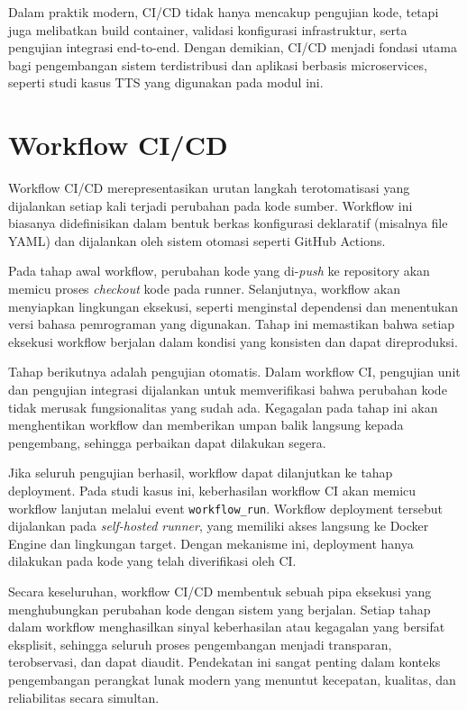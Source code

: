Dalam praktik modern, CI/CD tidak hanya mencakup pengujian kode, tetapi juga
melibatkan build container, validasi konfigurasi infrastruktur, serta
pengujian integrasi end-to-end. Dengan demikian, CI/CD menjadi fondasi utama
bagi pengembangan sistem terdistribusi dan aplikasi berbasis microservices,
seperti studi kasus TTS yang digunakan pada modul ini.

\section{Workflow CI/CD}

Workflow CI/CD merepresentasikan urutan langkah terotomatisasi yang dijalankan
setiap kali terjadi perubahan pada kode sumber. Workflow ini biasanya
didefinisikan dalam bentuk berkas konfigurasi deklaratif (misalnya file YAML)
dan dijalankan oleh sistem otomasi seperti GitHub Actions.

Pada tahap awal workflow, perubahan kode yang di-\textit{push} ke repository
akan memicu proses \textit{checkout} kode pada runner. Selanjutnya, workflow
akan menyiapkan lingkungan eksekusi, seperti menginstal dependensi dan
menentukan versi bahasa pemrograman yang digunakan. Tahap ini memastikan bahwa
setiap eksekusi workflow berjalan dalam kondisi yang konsisten dan dapat
direproduksi.

Tahap berikutnya adalah pengujian otomatis. Dalam workflow CI, pengujian unit
dan pengujian integrasi dijalankan untuk memverifikasi bahwa perubahan kode
tidak merusak fungsionalitas yang sudah ada. Kegagalan pada tahap ini akan
menghentikan workflow dan memberikan umpan balik langsung kepada pengembang,
sehingga perbaikan dapat dilakukan segera.

Jika seluruh pengujian berhasil, workflow dapat dilanjutkan ke tahap
deployment. Pada studi kasus ini, keberhasilan workflow CI akan memicu
workflow lanjutan melalui event \texttt{workflow\_run}. Workflow deployment
tersebut dijalankan pada \textit{self-hosted runner}, yang memiliki akses
langsung ke Docker Engine dan lingkungan target. Dengan mekanisme ini,
deployment hanya dilakukan pada kode yang telah diverifikasi oleh CI.

Secara keseluruhan, workflow CI/CD membentuk sebuah pipa eksekusi yang
menghubungkan perubahan kode dengan sistem yang berjalan. Setiap tahap dalam
workflow menghasilkan sinyal keberhasilan atau kegagalan yang bersifat
eksplisit, sehingga seluruh proses pengembangan menjadi transparan,
terobservasi, dan dapat diaudit. Pendekatan ini sangat penting dalam konteks
pengembangan perangkat lunak modern yang menuntut kecepatan, kualitas, dan
reliabilitas secara simultan.


